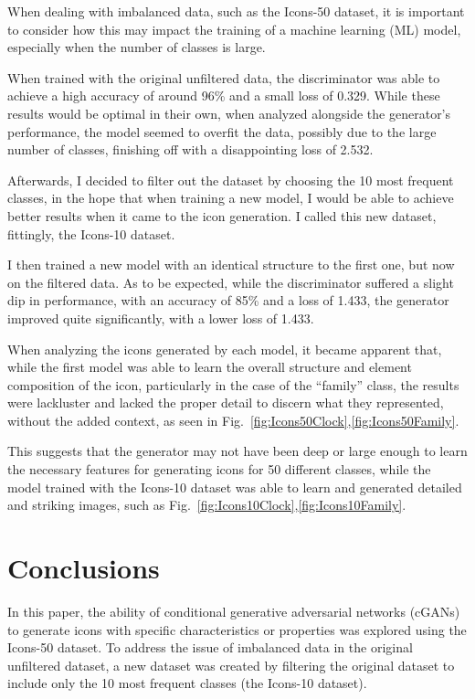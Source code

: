 \documentclass[conference]{IEEEtran}
\begin{document}
    When dealing with imbalanced data, such as the Icons-50 dataset, it is important to consider how this may impact the training of a machine learning (ML) model, especially when the number of classes is large.

    When trained with the original unfiltered data, the discriminator was able to achieve a high accuracy of around 96\% and a small loss of 0.329.
    While these results would be optimal in their own, when analyzed alongside the generator's performance, the model seemed to overfit the data, possibly due to the large number of classes, finishing off with a disappointing loss of 2.532.

    Afterwards, I decided to filter out the dataset by choosing the 10 most frequent classes, in the hope that when training a new model, I would be able to achieve better results when it came to the icon generation.
    I called this new dataset, fittingly, the Icons-10 dataset.

    I then trained a new model with an identical structure to the first one, but now on the filtered data.
    As to be expected, while the discriminator suffered a slight dip in performance, with an accuracy of 85\% and a loss of 1.433, the generator improved quite significantly, with a lower loss of 1.433.

    When analyzing the icons generated by each model, it became apparent that, while the first model was able to learn the overall structure and element composition of the icon, particularly in the case of the ``family'' class, the results were lackluster and lacked the proper detail to discern what they represented, without the added context, as seen in Fig.~\ref{fig:Icons50Clock},\ref{fig:Icons50Family}.

    This suggests that the generator may not have been deep or large enough to learn the necessary features for generating icons for 50 different classes, while the model trained with the Icons-10 dataset was able to learn and generated detailed and striking images, such as Fig.~\ref{fig:Icons10Clock},\ref{fig:Icons10Family}.


    \section{Conclusions}\label{sec:conclusions}
    In this paper, the ability of conditional generative adversarial networks (cGANs) to generate icons with specific characteristics or properties was explored using the Icons-50 dataset.
    To address the issue of imbalanced data in the original unfiltered dataset, a new dataset was created by filtering the original dataset to include only the 10 most frequent classes (the Icons-10 dataset).
\end{document}
